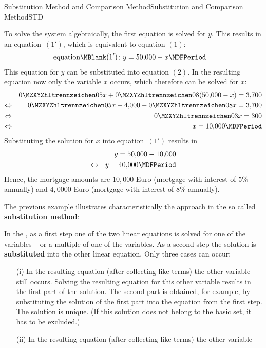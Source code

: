 \begin{MXContent}{Substitution Method and Comparison Method}{Substitution and Comparison Method}{STD}
\begin{MExample}
To solve the system algebraically, the first equation is solved for $y$. This results in an  
equation~$(1')$, which is equivalent to equation $(1)$:
\begin{eqnarray*}
\mbox{equation}\MBlank (1') & \colon y = 50{,}000 - x\MDFPeriod 
\end{eqnarray*}
This equation for $y$ can be substituted into equation $(2)$. In the resulting 
equation now only the variable  
$x$ occurs, which therefore can be solved for $x$:
\begin{eqnarray*}
& & \MZahl{0}{05} x + \MZahl{0}{08} (50{,}000 - x) = 3{,}700 \\
\Leftrightarrow & & \MZahl{0}{05} x + 4{,}000 - \MZahl{0}{08} x = 3{,}700 \\
\Leftrightarrow & & \MZahl{0}{03} x = 300 \\
\Leftrightarrow & & x = 10{,}000\MDFPeriod 
\end{eqnarray*}
Substituting the solution for $x$ into equation~$(1')$ results in
\begin{eqnarray*}
& & y = 50{,}000 - 10{,}000 \\
\Leftrightarrow & & y = 40{,}000\MDFPeriod 
\end{eqnarray*}
Hence, the mortgage amounts are $10{,}000$ Euro (mortgage with interest of $5\%$ annually) and
$4{,}0000$ Euro (mortgage with interest of $8\%$ annually).
\end{MExample}
The previous example illustrates characteristically the approach in the so called 
\textbf{substitution method}:
\begin{MInfo}
In the , as a first step 
one of the two linear equations is solved for one of the variables -- or a multiple 
of one of the variables. As a second step the solution is 
\textbf{substituted} into the other linear equation. Only three cases can occur:
\begin{itemize}
\item[(i)]{In the resulting equation (after collecting like terms) the other variable
still occurs. Solving the resulting equation for this other variable results in the first
part of the solution. The second part is obtained, for example, by substituting the solution
of the first part into the equation from the first step. The solution is unique. (If this
solution does not belong to the basic set, it has to be excluded.)}
\item[(ii)]{In the resulting equation (after collecting like terms) the other variable
}
\end{itemize}
\end{MInfo}
\end{MXContent}
